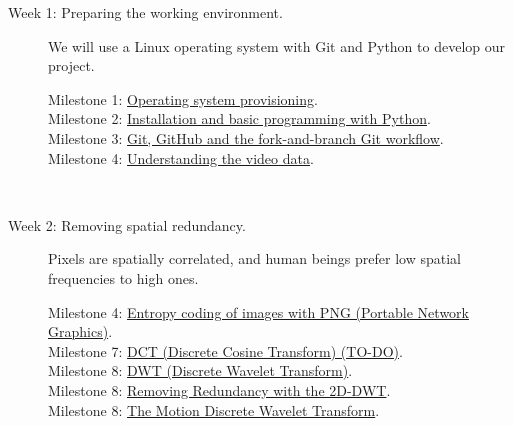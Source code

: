 \begin{description}
\item [Week 1: {\normalfont Preparing the working
    environment.}] We will use a Linux operating system with
  Git and Python to develop our project.
  \begin{description}
  \item [Milestone 1: {\normalfont \href{https://sistemas-multimedia.github.io/milestones/01-provisioning/}{Operating system provisioning}.}]
  \item [Milestone 2: {\normalfont \href{https://sistemas-multimedia.github.io/milestones/02-python/}{Installation and basic programming with Python}.}]
  \item [Milestone 3: {\normalfont \href{https://sistemas-multimedia.github.io/milestones/03-git/}{Git, GitHub and the fork-and-branch Git workflow}.}]
  \item [Milestone 4: {\normalfont \href{https://sistemas-multimedia.github.io/milestones/04-the_data/}{Understanding the video data}.}]
  \end{description}
  ~\newline
\item [Week 2: {\normalfont Removing spatial redundancy.}] Pixels are spatially correlated, and human beings prefer low spatial frequencies to high ones.
  \begin{description}
  \item [Milestone 4: {\normalfont \href{https://sistemas-multimedia.github.io/milestones/04-the_data/}{Entropy coding of images with PNG (Portable Network Graphics)}.}]
  \item [Milestone 7: {\normalfont \href{}{DCT (Discrete Cosine Transform) (TO-DO)}.}] %
  \item [Milestone 8: {\normalfont \href{https://sistemas-multimedia.github.io/milestones/07-DWT/}{DWT (Discrete Wavelet Transform)}.}] %
  \item [Milestone 8: {\normalfont \href{https://sistemas-multimedia.github.io/milestones/08-2D-DWT/}{Removing Redundancy with the 2D-DWT}.}] %
  \item [Milestone 8: {\normalfont \href{https://sistemas-multimedia.github.io/milestones/09-MDWT/}{The Motion Discrete Wavelet Transform}.}] %

\end{description}
\end{description}
